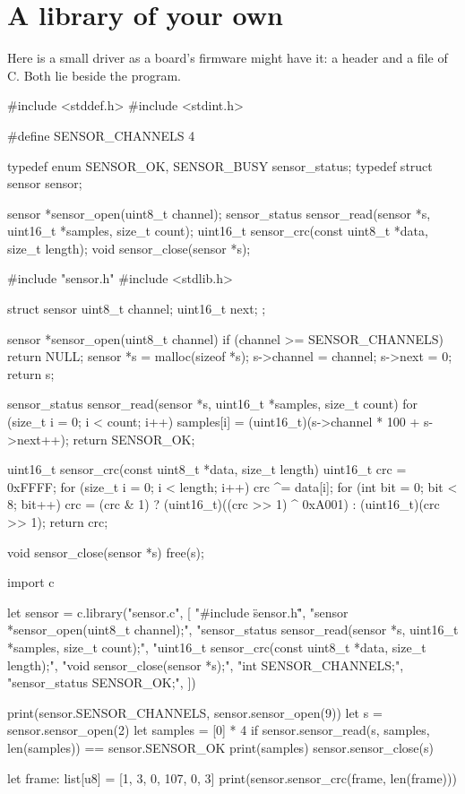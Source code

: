 \section{A library of your own}

Here is a small driver as a board's firmware might have it: a header
and a file of C. Both lie beside the program.

\begin{zeno}[file=sensor.h, dir=sensor, run=no]
#include <stddef.h>
#include <stdint.h>

#define SENSOR_CHANNELS 4

typedef enum { SENSOR_OK, SENSOR_BUSY } sensor_status;
typedef struct sensor sensor;

sensor *sensor_open(uint8_t channel);
sensor_status sensor_read(sensor *s, uint16_t *samples, size_t count);
uint16_t sensor_crc(const uint8_t *data, size_t length);
void sensor_close(sensor *s);
\end{zeno}

\begin{zeno}[file=sensor.c, dir=sensor, run=no]
#include "sensor.h"
#include <stdlib.h>

struct sensor { uint8_t channel; uint16_t next; };

sensor *sensor_open(uint8_t channel) {
    if (channel >= SENSOR_CHANNELS) return NULL;
    sensor *s = malloc(sizeof *s);
    s->channel = channel;
    s->next = 0;
    return s;
}

sensor_status sensor_read(sensor *s, uint16_t *samples, size_t count) {
    for (size_t i = 0; i < count; i++) {
        samples[i] = (uint16_t)(s->channel * 100 + s->next++);
    }
    return SENSOR_OK;
}

uint16_t sensor_crc(const uint8_t *data, size_t length) {
    uint16_t crc = 0xFFFF;
    for (size_t i = 0; i < length; i++) {
        crc ^= data[i];
        for (int bit = 0; bit < 8; bit++) {
            crc = (crc & 1) ? (uint16_t)((crc >> 1) ^ 0xA001) : (uint16_t)(crc >> 1);
        }
    }
    return crc;
}

void sensor_close(sensor *s) { free(s); }
\end{zeno}

\begin{zeno}[file=read.zeno, dir=sensor]
import c

let sensor = c.library("sensor.c", [
    "#include \"sensor.h\"",
    "sensor *sensor_open(uint8_t channel);",
    "sensor_status sensor_read(sensor *s, uint16_t *samples, size_t count);",
    "uint16_t sensor_crc(const uint8_t *data, size_t length);",
    "void sensor_close(sensor *s);",
    "int SENSOR_CHANNELS;",
    "sensor_status SENSOR_OK;",
])

print(sensor.SENSOR_CHANNELS, sensor.sensor_open(9))
let s = sensor.sensor_open(2)
let samples = [0] * 4
if sensor.sensor_read(s, samples, len(samples)) == sensor.SENSOR_OK {
    print(samples)
}
sensor.sensor_close(s)

let frame: list[u8] = [1, 3, 0, 107, 0, 3]
print(sensor.sensor_crc(frame, len(frame)))
\end{zeno}

